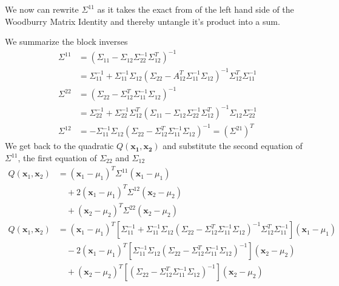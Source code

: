 \documentclass{article}
\begin{document}
We now can rewrite $\Sigma^{11}$ as it takes the exact from of the left hand side of the Woodburry Matrix Identity and thereby untangle it's product into a sum.

\bigbreak
We summarize the block inverses
\begin{align*}
\Sigma^{11}&=\left(\Sigma_{11}-\Sigma_{12} \Sigma_{22}^{-1} \Sigma_{12}^{T}\right)^{-1} \\
&=\Sigma_{11}^{-1}+\Sigma_{11}^{-1} \Sigma_{12}\left(\Sigma_{22}-A_{12}^{T} \Sigma_{11}^{-1} \Sigma_{12}\right)^{-1} \Sigma_{12}^{T} \Sigma_{11}^{-1} \\
\Sigma^{22}&=\left(\Sigma_{22}-\Sigma_{12}^{T} \Sigma_{11}^{-1} \Sigma_{12}\right)^{-1} \\
&=\Sigma_{22}^{-1}+\Sigma_{22}^{-1} \Sigma_{12}^{T}\left(\Sigma_{11}-\Sigma_{12} \Sigma_{22}^{-1} \Sigma_{12}^{T}\right)^{-1} \Sigma_{12} \Sigma_{22}^{-1} \\
\Sigma^{12}&=-\Sigma_{11}^{-1} \Sigma_{12}\left(\Sigma_{22}-\Sigma_{12}^{T} \Sigma_{11}^{-1} \Sigma_{12}\right)^{-1}=\left(\Sigma^{21}\right)^{T}
\end{align*}
We get back to the quadratic $Q(\mathbf{x_1},\mathbf{x_2})$ and substitute the second equation of $\Sigma^{11}$, the first equation of $\Sigma_{22}$ and $\Sigma_{12}$ 
\begin{align*}
Q\left(\mathbf{x}_{1}, \mathbf{x}_{2}\right)&=\left(\mathbf{x}_{1}-\mu_{1}\right)^{T} \Sigma^{11}\left(\mathbf{x}_{1}-\mu_{1}\right) \\
&\quad+2\left(\mathbf{x}_{1}-\mu_{1}\right)^{T} \Sigma^{12}\left(\mathbf{x}_{2}-\mu_{2}\right) \\
&\quad+\left(\mathbf{x}_{2}-\mu_{2}\right)^{T} \Sigma^{22}\left(\mathbf{x}_{2}-\mu_{2}\right) \\
Q\left(\mathbf{x}_{1}, \mathbf{x}_{2}\right)&=\left(\mathbf{x}_{1}-\mu_{1}\right)^{T}\left[\Sigma_{11}^{-1}+\Sigma_{11}^{-1} \Sigma_{12}\left(\Sigma_{22}-\Sigma_{12}^{T} \Sigma_{11}^{-1} \Sigma_{12}\right)^{-1} \Sigma_{12}^{T} \Sigma_{11}^{-1}\right]\left(\mathbf{x}_{1}-\mu_{1}\right) \\
&\quad -2\left(\mathbf{x}_{1}-\mu_{1}\right)^{T}\left[\Sigma_{11}^{-1} \Sigma_{12}\left(\Sigma_{22}-\Sigma_{12}^{T} \Sigma_{11}^{-1} \Sigma_{12}\right)^{-1}\right]\left(\mathbf{x}_{2}-\mu_{2}\right) \\
&\quad +\left(\mathbf{x}_{2}-\mu_{2}\right)^{T}\left[\left(\Sigma_{22}-\Sigma_{12}^{T} \Sigma_{11}^{-1} \Sigma_{12}\right)^{-1}\right]\left(\mathbf{x}_{2}-\mu_{2}\right)
\end{align*}
\end{document}

